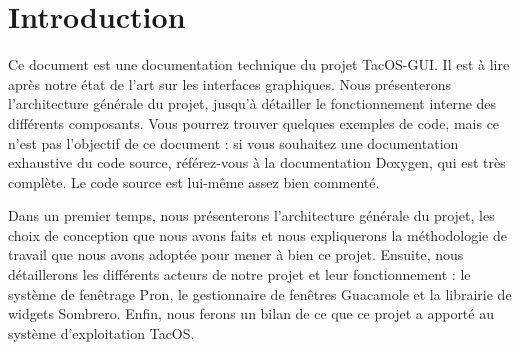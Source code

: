 \section{Introduction}

Ce document est une documentation technique du projet TacOS-GUI.
Il est à lire après notre état de l'art sur les interfaces graphiques.
Nous présenterons l'architecture générale du projet, jusqu'à détailler le fonctionnement interne des différents composants.
Vous pourrez trouver quelques exemples de code, mais ce n'est pas l'objectif de ce document :
si vous souhaitez une documentation exhaustive du code source, référez-vous à la documentation Doxygen, qui est très complète.
Le code source est lui-même assez bien commenté.

Dans un premier temps, nous présenterons l'architecture générale du projet, les choix de conception que nous avons faits et nous expliquerons la méthodologie de travail que nous avons adoptée pour mener à bien ce projet.
Ensuite, nous détaillerons les différents acteurs de notre projet et leur fonctionnement : le système de fenêtrage Pron, le gestionnaire de fenêtres Guacamole et la librairie de widgets Sombrero.
Enfin, nous ferons un bilan de ce que ce projet a apporté au système d'exploitation TacOS.
